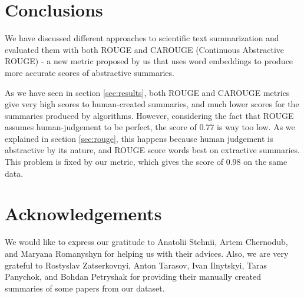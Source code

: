\documentclass[sigplan]{acmart}
\begin{document}
\section*{Conclusions}

We have discussed different approaches to scientific text summarization and evaluated them with both ROUGE and CAROUGE (Continuous Abstractive ROUGE) - a new metric proposed by us that uses word embeddings to produce more accurate scores of abstractive summaries.

As we have seen in section \ref{sec:results}, both ROUGE and CAROUGE metrics give very high scores to human-created summaries, and much lower scores for the summaries produced by algorithms. However, considering the fact that ROUGE assumes human-judgement to be perfect, the score of 0.77 is way too low. As we explained in section \ref{sec:rouge}, this happens because human judgement is abstractive by its nature, and ROUGE score words best on extractive summaries. This problem is fixed by our metric, which gives the score of 0.98 on the same data.

\section*{Acknowledgements}

We would like to express our gratitude to Anatolii Stehnii, Artem Chernodub, and Maryana Romanyshyn for helping us with their advices. Also, we are very grateful to Rostyslav Zatserkovnyi, Anton Tarasov, Ivan Ilnytskyi, Taras Panychok, and Bohdan Petryshak for providing their manually created summaries of some papers from our dataset.



\end{document}
